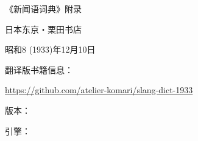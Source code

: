 
\maketitle



《新闻语词典》附录

日本东京・栗田书店

昭和8 (1933)年12月10日

\vspace*{\fill}

翻译版书籍信息：

\url{https://github.com/atelier-komari/slang-dict-1933}

版本：\gitversion

引擎：\engineversion

\clearpage
